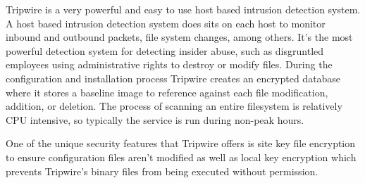 \documentclass[./main.tex]{subfiles}
\begin{document}
Tripwire is a very powerful and easy to use host based intrusion detection system. A host based intrusion detection system does sits on each host to monitor inbound and outbound packets, file system changes, among others. It’s the most powerful detection system for detecting insider abuse, such as disgruntled employees using administrative rights to destroy or modify files. During the configuration and installation process Tripwire creates an encrypted database where it stores a baseline image to reference against each file modification, addition, or deletion. The process of scanning an entire filesystem is relatively CPU intensive, so typically the service is run during non-peak hours.

One of the unique security features that Tripwire offers is site key file encryption to ensure configuration files aren’t modified as well as local key encryption which prevents Tripwire’s binary files from being executed without permission.
\end{document}
